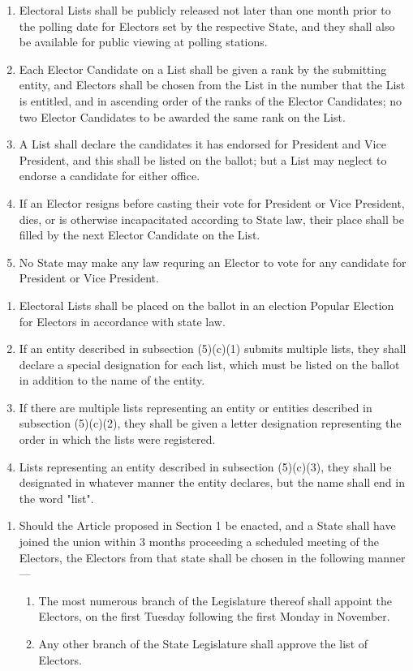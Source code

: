 \documentclass{article}
\begin{document}
\begin{enumerate}
        \item Electoral Lists shall be publicly released not later than one month prior to the polling date for Electors set by the respective State, and they shall also be available for public viewing at polling stations.
        \item Each Elector Candidate on a List shall be given a rank by the submitting entity, and Electors shall be chosen from the List in the number that the List is entitled, and in ascending order of the ranks of the Elector Candidates; no two Elector Candidates to be awarded the same rank on the List.
        \item A List shall declare the candidates it has endorsed for President and Vice President, and this shall be listed on the ballot; but a List may neglect to endorse a candidate for either office.
        \item If an Elector resigns before casting their vote for President or Vice President, dies, or is otherwise incapacitated according to State law, their place shall be filled by the next Elector Candidate on the List.
        \item No State may make any law requring an Elector to vote for any candidate for President or Vice President.
    \end{enumerate}
    \begin{enumerate}
        \item Electoral Lists shall be placed on the ballot in an election Popular Election for Electors in accordance with state law.
        \item If an entity described in subsection (5)(c)(1) submits multiple lists, they shall declare a special designation for each list, which must be listed on the ballot in addition to the name of the entity.
        \item If there are multiple lists representing an entity or entities described in subsection (5)(c)(2), they shall be given a letter designation representing the order in which the lists were registered.
        \item Lists representing an entity described in subsection (5)(c)(3), they shall be designated in whatever manner the entity declares, but the name shall end in the word "list". 
    \end{enumerate}
    \begin{enumerate}   
        \item Should the Article proposed in Section 1 be enacted, and a State shall have joined the union within 3 months proceeding a scheduled meeting of the Electors, the Electors from that state shall be chosen in the following manner---
        \begin{enumerate}
            \item The most numerous branch of the Legislature thereof shall appoint the Electors, on the first Tuesday following the first Monday in November.
            \item Any other branch of the State Legislature shall approve the list of Electors.
        \end{enumerate}
    \end{enumerate}
\end{document}
